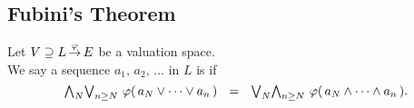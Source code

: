 \documentclass[main.tex]{subfiles}
\begin{document}
%
%
\subsection{Fubini's Theorem}
\begin{dfn}
Let $V \supseteq L\,\smash{\stackrel{\varphi}{\rightarrow}}\,E$ be a valuation space.\\
We say a sequence $a_1,\,a_2,\,\dotsc$ in $L$
is  if
\begin{equation}
\bw_{N}\bv_{n\geq N} \ \varphi(\,a_N \vee \dotsb \vee a_{n}\,) 
\ \ =\ \ 
 \bv_N\bw_{n\geq N} \ \varphi(\,a_N \wedge\dotsb \wedge a_{n}\,).
\end{equation}
\end{dfn}
\end{document}
